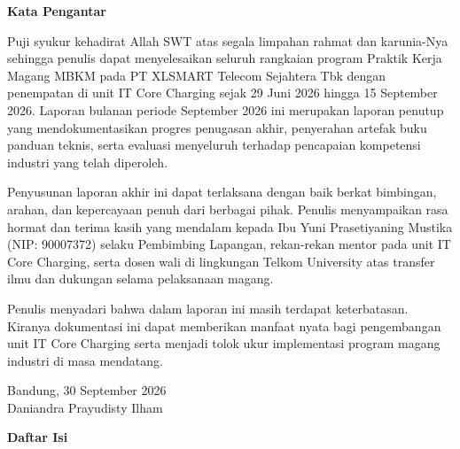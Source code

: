 \documentclass[12pt,a4paper]{article}
\begin{document}
\clearpage
\setcounter{page}{3}

\begin{center}
    {\bfseries\large Kata Pengantar\par}
\end{center}
\vspace{0.6cm}

Puji syukur kehadirat Allah SWT atas segala limpahan rahmat dan karunia-Nya sehingga penulis dapat menyelesaikan seluruh rangkaian program Praktik Kerja Magang MBKM pada PT XLSMART Telecom Sejahtera Tbk dengan penempatan di unit IT Core Charging sejak 29 Juni 2026 hingga 15 September 2026. Laporan bulanan periode September 2026 ini merupakan laporan penutup yang mendokumentasikan progres penugasan akhir, penyerahan artefak buku panduan teknis, serta evaluasi menyeluruh terhadap pencapaian kompetensi industri yang telah diperoleh.

Penyusunan laporan akhir ini dapat terlaksana dengan baik berkat bimbingan, arahan, dan kepercayaan penuh dari berbagai pihak. Penulis menyampaikan rasa hormat dan terima kasih yang mendalam kepada Ibu Yuni Prasetiyaning Mustika (NIP: 90007372) selaku Pembimbing Lapangan, rekan-rekan mentor pada unit IT Core Charging, serta dosen wali di lingkungan Telkom University atas transfer ilmu dan dukungan selama pelaksanaan magang.

Penulis menyadari bahwa dalam laporan ini masih terdapat keterbatasan. Kiranya dokumentasi ini dapat memberikan manfaat nyata bagi pengembangan unit IT Core Charging serta menjadi tolok ukur implementasi program magang industri di masa mendatang.

\vspace{1.2cm}
\noindent
\begin{flushright}
    Bandung, 30 September 2026\\[2.0cm]
    Daniandra Prayudisty Ilham
\end{flushright}

\clearpage
\setcounter{page}{4}

\begin{center}
    {\bfseries\large Daftar Isi\par}
\end{center}
\vspace{0.6cm}
\end{document}
